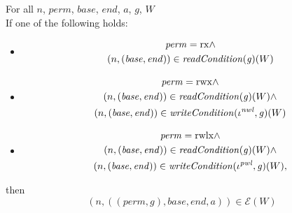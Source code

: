 \documentclass[a4paper]{article}
\newcommand{\var}[1]{\mathit{#1}}
\newcommand{\gl}{\var{g}}
\newcommand{\addr}{\var{a}}
\newcommand{\start}{\var{base}}
\newcommand{\addrend}{\var{end}}
\newcommand{\perm}{\var{perm}}
\newcommand{\nwl}{\var{nwl}}
\newcommand{\pwl}{\var{pwl}}
\newcommand{\plainfun}[2]{
  \ifthenelse{\equal{#2}{}}
  {\mathit{#1}}
  {\mathit{#1}(#2)}
}
\newcommand{\readCond}[1]{\plainfun{readCondition}{#1}}
\newcommand{\writeCond}[1]{\plainfun{writeCondition}{#1}}
\newcommand{\asmType}{\plaindom{AsmType}}
\newcommand{\plaindom}[1]{\mathrm{#1}}
\newcommand{\intr}[2]{\mathcal{#1}}
\newcommand{\exprintr}[1]{\intr{E}{#1}}
\newcommand{\stder}{\exprintr{\asmType}}
\newcommand{\npair}[2][n]{\left(#1,#2 \right)}
\newcommand{\plainperm}[1]{\mathrm{#1}}
\newcommand{\exec}{\plainperm{rx}}
\newcommand{\rwx}{\plainperm{rwx}}
\newcommand{\rwlx}{\plainperm{rwlx}}
\begin{document}
\begin{theorem}
  \label{thm:ftlr}
  For all $n$, $\perm$, $\start$, $\addrend$, $\addr$, $\gl$, $W$  \\
  If one of the following holds:
  \begin{itemize}
  \item \[
      \begin{gathered}
        \perm = \exec \land\\
        \npair{(\start,\addrend)} \in \readCond{}(\gl)(W)
      \end{gathered}
    \]
  \item \[
      \begin{gathered}
        \perm = \rwx \land \\
        \npair{(\start,\addrend)} \in \readCond{}(\gl)(W) \land\\
        \npair{(\start,\addrend)} \in \writeCond{}(\iota^\nwl,\gl)(W)
      \end{gathered}
    \]
  \item \[
      \begin{gathered}
        \perm = \rwlx \land\\
        \npair{(\start,\addrend)} \in \readCond{}(\gl)(W) \land\\
        \npair{(\start,\addrend)} \in \writeCond{}(\iota^\pwl,\gl)(W),
      \end{gathered}
    \]
  \end{itemize}
  then
  \[
    \npair{((\perm,\gl),\start,\addrend,\addr)} \in \stder(W)
  \]
\end{theorem}
\end{document}
